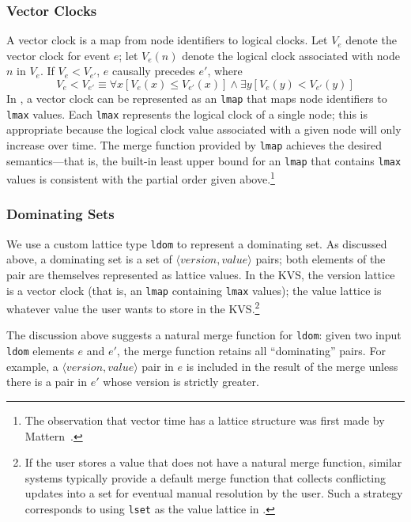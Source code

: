 \subsubsection{Vector Clocks}
A vector clock is a map from node identifiers to logical clocks. Let $V_e$
denote the vector clock for event $e$; let $V_e(n)$ denote the logical clock
associated with node $n$ in $V_e$. If $V_e < V_{e'}$, $e$ causally precedes
$e'$, where
\begin{displaymath}
V_e < V_{e'} \equiv \forall x [ V_e(x) \leq V_{e'}(x) ] \land \exists y [ V_e(y) < V_{e'}(y) ]  
\end{displaymath}
In \lang, a vector clock can be represented as an \texttt{lmap} that maps node
identifiers to \texttt{lmax} values. Each \texttt{lmax} represents the logical
clock of a single node; this is appropriate because the logical clock value
associated with a given node will only increase over time. The merge function
provided by \texttt{lmap} achieves the desired semantics---that is, the built-in
least upper bound for an \texttt{lmap} that contains \texttt{lmax} values is
consistent with the partial order given above.\footnote{The observation that
  vector time has a lattice structure was first made by
  Mattern~\cite{Mattern1989}.}

\subsubsection{Dominating Sets}
We use a custom lattice type \texttt{ldom} to represent a dominating set. As
discussed above, a dominating set is a set of
$\langle\textit{version},\textit{value}\rangle$ pairs; both elements of the pair
are themselves represented as lattice values. In the KVS, the version lattice is
a vector clock (that is, an \texttt{lmap} containing \texttt{lmax} values); the
value lattice is whatever value the user wants to store in the KVS.\footnote{If
  the user stores a value that does not have a natural merge function, similar
  systems typically provide a default merge function that collects conflicting
  updates into a set for eventual manual resolution by the user. Such a strategy
  corresponds to using \texttt{lset} as the value lattice in \lang.}

The discussion above suggests a natural merge function for \texttt{ldom}: given
two input \texttt{ldom} elements $e$ and $e'$, the merge function retains all
``dominating'' pairs. For example, a
$\langle\textit{version},\textit{value}\rangle$ pair in $e$ is included in the
result of the merge unless there is a pair in $e'$ whose version is strictly
greater.

